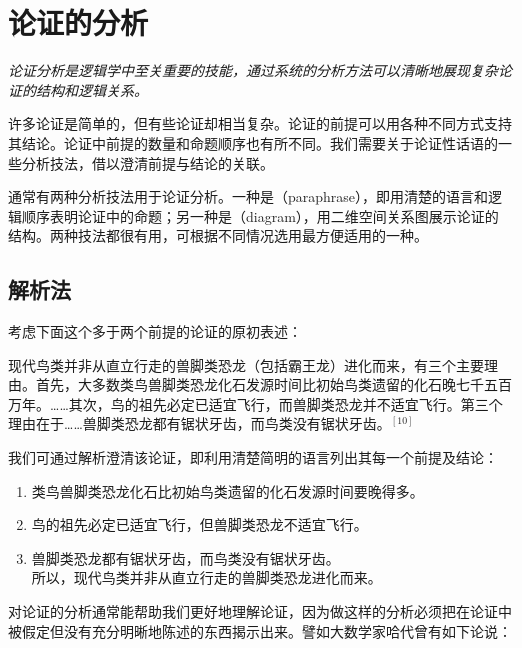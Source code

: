 \section{论证的分析}

\begin{logicbox}[title=引言]
\textit{论证分析是逻辑学中至关重要的技能，通过系统的分析方法可以清晰地展现复杂论证的结构和逻辑关系。}
\end{logicbox}

许多论证是简单的，但有些论证却相当复杂。论证的前提可以用各种不同方式支持其结论。论证中前提的数量和命题顺序也有所不同。我们需要关于论证性话语的一些分析技法，借以澄清前提与结论的关联。

\begin{theorembox}[title=两种分析方法]
通常有两种分析技法用于论证分析。一种是（paraphrase），即用清楚的语言和逻辑顺序表明论证中的命题；另一种是（diagram），用二维空间关系图展示论证的结构。两种技法都很有用，可根据不同情况选用最方便适用的一种。
\end{theorembox}

\subsection{解析法}

考虑下面这个多于两个前提的论证的原初表述：

\begin{examplebox}[title=解析法示例]
现代鸟类并非从直立行走的兽脚类恐龙（包括霸王龙）进化而来，有三个主要理由。首先，大多数类鸟兽脚类恐龙化石发源时间比初始鸟类遗留的化石晚七千五百万年。……其次，鸟的祖先必定已适宜飞行，而兽脚类恐龙并不适宜飞行。第三个理由在于……兽脚类恐龙都有锯状牙齿，而鸟类没有锯状牙齿。${}^{[10]}$
\end{examplebox}

我们可通过解析澄清该论证，即利用清楚简明的语言列出其每一个前提及结论：

\begin{enumerate}
  \item 类鸟兽脚类恐龙化石比初始鸟类遗留的化石发源时间要晚得多。
  \item 鸟的祖先必定已适宜飞行，但兽脚类恐龙不适宜飞行。
  \item 兽脚类恐龙都有锯状牙齿，而鸟类没有锯状牙齿。\\
  所以，现代鸟类并非从直立行走的兽脚类恐龙进化而来。
\end{enumerate}

对论证的分析通常能帮助我们更好地理解论证，因为做这样的分析必须把在论证中被假定但没有充分明晰地陈述的东西揭示出来。譬如大数学家哈代曾有如下论说：

